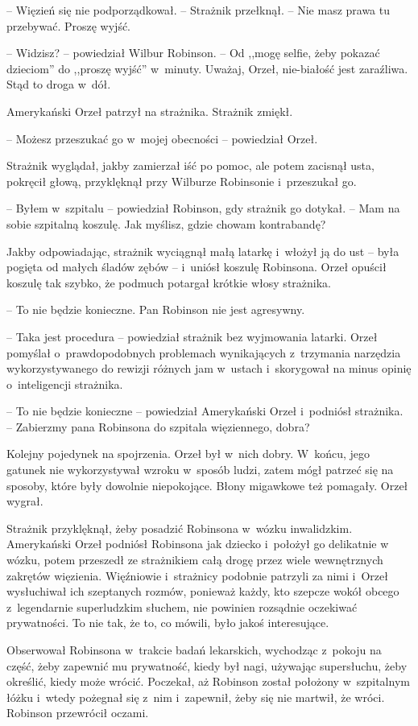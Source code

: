 \documentclass[oneside,polish,11pt,sfheadings]{mwbk}
\begin{document}
-- Więzień się nie podporządkował. -- Strażnik przełknął. -- Nie masz prawa
tu przebywać. Proszę wyjść.

-- Widzisz? -- powiedział Wilbur Robinson. -- Od ,,mogę selfie, żeby
pokazać dzieciom'' do ,,proszę wyjść'' w~minuty. Uważaj, Orzeł,
nie-białość jest zaraźliwa. Stąd to droga w~dół.

Amerykański Orzeł patrzył na strażnika. Strażnik zmiękł.

-- Możesz przeszukać go w~mojej obecności -- powiedział Orzeł.

Strażnik wyglądał, jakby zamierzał iść po pomoc, ale potem zacisnął
usta, pokręcił głową, przyklęknął przy Wilburze Robinsonie i~przeszukał
go.

-- Byłem w~szpitalu -- powiedział Robinson, gdy strażnik go dotykał. -- Mam
na sobie szpitalną koszulę. Jak myślisz, gdzie chowam kontrabandę?

Jakby odpowiadając, strażnik wyciągnął małą latarkę i~włożył ją do ust -- była pogięta od małych śladów zębów -- i~uniósł koszulę Robinsona. Orzeł
opuścił koszulę tak szybko, że podmuch potargał krótkie włosy strażnika.

-- To nie będzie konieczne. Pan Robinson nie jest agresywny.

-- Taka jest procedura -- powiedział strażnik bez wyjmowania latarki.
Orzeł pomyślał o~prawdopodobnych problemach wynikających z~trzymania
narzędzia wykorzystywanego do rewizji różnych jam w~ustach i~skorygował
na minus opinię o~inteligencji strażnika.

-- To nie będzie konieczne -- powiedział Amerykański Orzeł i~podniósł
strażnika. -- Zabierzmy pana Robinsona do szpitala więziennego, dobra?

Kolejny pojedynek na spojrzenia. Orzeł był w~nich dobry. W~końcu, jego
gatunek nie wykorzystywał wzroku w~sposób ludzi, zatem mógł patrzeć się
na sposoby, które były dowolnie niepokojące. Błony migawkowe też
pomagały. Orzeł wygrał.

Strażnik przyklęknął, żeby posadzić Robinsona w~wózku inwalidzkim.
Amerykański Orzeł podniósł Robinsona jak dziecko i~położył go delikatnie
w wózku, potem przeszedł ze strażnikiem całą drogę przez wiele
wewnętrznych zakrętów więzienia. Więźniowie i~strażnicy podobnie
patrzyli za nimi i~Orzeł wysłuchiwał ich szeptanych rozmów, ponieważ
każdy, kto szepcze wokół obcego z~legendarnie superludzkim słuchem, nie
powinien rozsądnie oczekiwać prywatności. To nie tak, że to, co mówili,
było jakoś interesujące.

Obserwował Robinsona w~trakcie badań lekarskich, wychodząc z~pokoju na
część, żeby zapewnić mu prywatność, kiedy był nagi, używając
supersłuchu, żeby określić, kiedy może wrócić. Poczekał, aż Robinson
został położony w~szpitalnym łóżku i~wtedy pożegnał się z~nim i~zapewnił, żeby się nie martwił, że wróci. Robinson przewrócił oczami.
\end{document}
